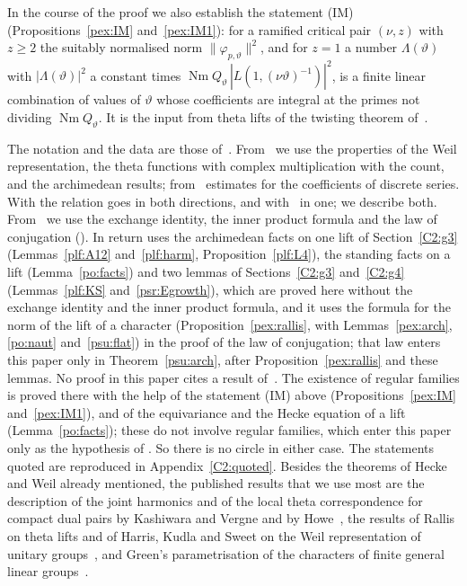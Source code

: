 \documentclass[10pt]{amsart}
\theoremstyle{definition}
\theoremstyle{remark}
\begin{document}
In the course of the proof we also establish the statement (IM)
(Propositions~\ref{pex:IM} and~\ref{pex:IM1}): for a ramified critical pair $(\nu,z)$ with $z\ge2$
the suitably normalised norm $\|\varphi_{p,\vartheta}\|^2$, and for $z=1$ a number
$\Lambda(\vartheta)$ with $|\Lambda(\vartheta)|^2$ a constant times
$\operatorname{Nm}Q_\vartheta\,|L(1,(\nu\vartheta)^{-1})|^2$, is a finite linear combination of
values of $\vartheta$ whose coefficients are integral at the primes not dividing
$\operatorname{Nm}Q_\vartheta$. It is the input from theta lifts of the twisting theorem
of~\cite{P55}.

The notation and the data are those of~\cite{P46}. From~\cite{P49} we use the properties of the
Weil representation, the theta functions with complex multiplication with the count, and the
archimedean results; from~\cite{P51} estimates for the coefficients of discrete series. With
\cite{P53} the relation goes in both directions, and with~\cite{P55} in one; we describe both. From~\cite{P53}
we use the exchange identity, the inner product formula and the law of conjugation
({\cite[Theorem~9.1]{P53}}). In return \cite{P53} uses the archimedean facts on one lift of
Section~\ref{C2:g3} (Lemmas~\ref{plf:A12} and~\ref{plf:harm}, Proposition~\ref{plf:L4}), the standing facts on a lift (Lemma~\ref{po:facts}) and two lemmas of Sections~\ref{C2:g3} and~\ref{C2:g4}
(Lemmas~\ref{plf:KS} and~\ref{psr:Egrowth}), which are proved here without the exchange identity
and the inner product formula, and it uses the formula for the norm of the lift of a character
(Proposition~\ref{pex:rallis}, with Lemmas~\ref{pex:arch}, \ref{po:naut} and~\ref{psu:flat}) in the proof of the law of conjugation; that law enters this paper
only in Theorem~\ref{psu:arch}, after Proposition~\ref{pex:rallis} and these lemmas. No proof in this paper cites a result of~\cite{P55}. The existence of regular
families is proved there with the help of the statement (IM) above (Propositions~\ref{pex:IM} and~\ref{pex:IM1}), and of the equivariance
and the Hecke equation of a lift (Lemma~\ref{po:facts}); these do not involve regular families,
which enter this paper only as the hypothesis of {\cite[Proposition~14.42]{P46}}. So there is no circle
in either case. The statements quoted are reproduced in Appendix~\ref{C2:quoted}. Besides the theorems of Hecke and Weil already
mentioned, the published results that we use most are the description of the joint harmonics and
of the local theta correspondence for compact dual pairs by Kashiwara and Vergne and by
Howe~\cite{KashiwaraVergne,HoweJAMS}, the results of Rallis on theta lifts and of Harris, Kudla
and Sweet on the Weil representation of unitary
groups~\cite{RallisInjectivity,HKS,KudlaSplitting}, and Green's parametrisation of the characters
of finite general linear groups~\cite{Green1955}.
\end{document}
